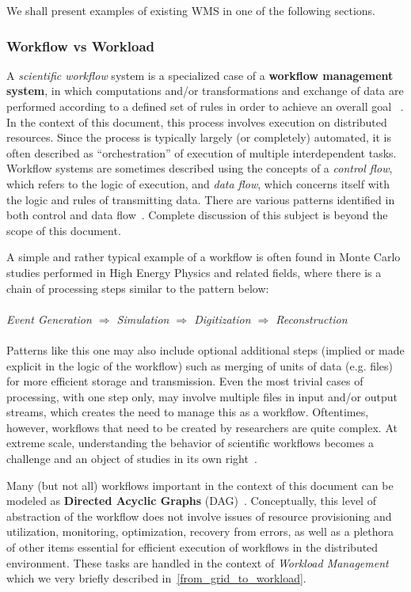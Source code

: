 We shall present examples of existing WMS in one of the following sections.

\subsubsection{Workflow vs Workload}
\label{workflow_workload}
A \textit{scientific workflow} system is a specialized case of a \textbf{workflow management system}, in which computations and/or transformations and exchange of data are performed according to a defined set of rules
in order to achieve an overall goal ~\cite{grid_workflow_taxonomy,grid_workflow_fit,pegasus}. In the context of this document, this process involves execution on distributed resources. Since the process is
typically largely (or completely) automated, it is often described as ``orchestration'' of execution of multiple interdependent tasks. Workflow systems are sometimes described using the concepts of a \textit{control flow},
which refers to the logic of execution, and \textit{data flow}, which concerns itself with the logic and rules of transmitting data. There are various patterns identified in both control and data flow~\cite{workflow_patterns}.
Complete discussion of this subject is beyond the scope of this document.

A simple and rather typical example of a workflow is often found in Monte Carlo studies performed in High Energy Physics and related fields, where there is a chain of processing steps similar to the pattern below:
\\
\\
\textit{Event  Generation $\Longrightarrow$ Simulation $\Longrightarrow$ Digitization $\Longrightarrow$ Reconstruction}
\\
\\
Patterns like this one may also include optional additional steps (implied or made explicit in the logic of the workflow) such as merging of units of data (e.g. files) for more efficient storage and transmission.
Even the most trivial cases of processing, with one step only, may involve multiple files in input and/or output streams, which creates the need to manage this as a workflow. Oftentimes, however,
workflows that need to be created by researchers are quite complex. At extreme scale, understanding the behavior of scientific workflows becomes a challenge and an object of studies in its own right~\cite{panorama}.

Many (but not all) workflows important in the context of this document can be modeled as
\textbf{Directed Acyclic Graphs} (DAG)~\cite{pegasus,deft1,grid_workflow_taxonomy}.
Conceptually, this level of abstraction of the workflow does not  involve issues of resource provisioning and utilization, monitoring, optimization, recovery from errors, as well as a plethora of other items essential
for efficient execution of workflows in the distributed environment. These tasks are handled in the context of \textit{Workload Management} which we very briefly described in~\ref{from_grid_to_workload}.

